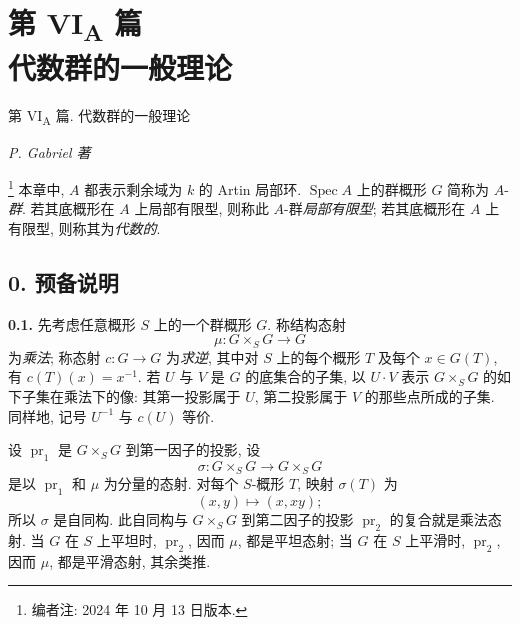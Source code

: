 
\setcounter{footnote}{-1}
\chapter*{第 \texorpdfstring{VI\textsubscript{A}}{VI_A} 篇\\
代数群的一般理论}
\label{sga3:VIA:title}
%
  {第 VI\textsubscript{A} 篇. 代数群的一般理论}

\begin{center}
  \textit{P. Gabriel 著}
\end{center}

\footnote{编者注: 2024 年 10 月 13 日版本.}
本章中, \(A\) 都表示剩余域为 \(k\) 的 Artin 局部环.
\(\operatorname{Spec} A\) 上的群概形 \(G\) 简称为
\(A\)-\emph{群}. 若其底概形在 \(A\) 上局部有限型,
则称此 \(A\)-群\emph{局部有限型};
若其底概形在 \(A\) 上有限型, 则称其为\emph{代数的}.

\section*{0. 预备说明}
\label{sga3:VIA:0}

\medskip
\noindent\textbf{0.1.}
\label{sga3:VIA:0.1}
先考虑任意概形 \(S\) 上的一个群概形 \(G\).
称结构态射
\[
  \mu:G\times_S G\longrightarrow G
\]
为\emph{乘法}; 称态射 \(c:G\to G\) 为\emph{求逆},
其中对 \(S\) 上的每个概形 \(T\) 及每个 \(x\in G(T)\),
有 \(c(T)(x)=x^{-1}\).
若 \(U\) 与 \(V\) 是 \(G\) 的底集合的子集,
以 \(U\cdot V\) 表示 \(G\times_S G\) 的如下子集在乘法下的像:
其第一投影属于 \(U\), 第二投影属于 \(V\) 的那些点所成的子集.
同样地, 记号 \(U^{-1}\) 与 \(c(U)\) 等价.

设 \(\operatorname{pr}_1\) 是 \(G\times_S G\) 到第一因子的投影,
设
\[
  \sigma:G\times_S G\longrightarrow G\times_S G
\]
是以 \(\operatorname{pr}_1\) 和 \(\mu\) 为分量的态射.
对每个 \(S\)-概形 \(T\), 映射 \(\sigma(T)\) 为
\[
  (x,y)\longmapsto (x,xy);
\]
所以 \(\sigma\) 是自同构.
此自同构与 \(G\times_S G\) 到第二因子的投影
\(\operatorname{pr}_2\) 的复合就是乘法态射.
当 \(G\) 在 \(S\) 上平坦时, \(\operatorname{pr}_2\),
因而 \(\mu\), 都是平坦态射;
当 \(G\) 在 \(S\) 上平滑时, \(\operatorname{pr}_2\),
因而 \(\mu\), 都是平滑态射, 其余类推.

